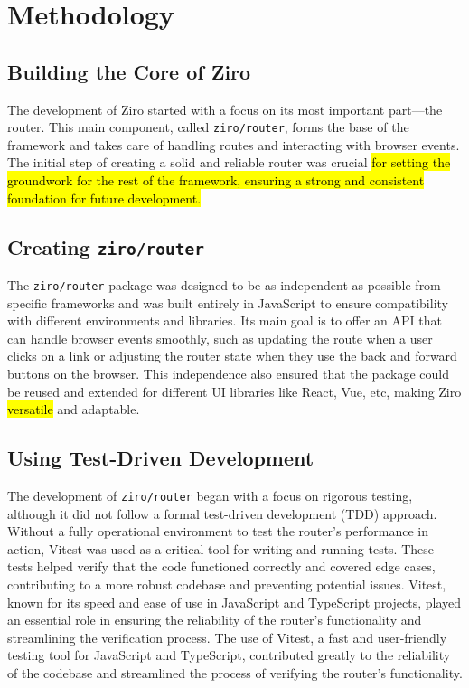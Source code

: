 \section{Methodology} %

\subsection{Building the Core of Ziro}
The development of Ziro started with a focus on its most important part—the router. This main component, called \texttt{ziro/router}, forms the base of the framework and takes care of handling routes and interacting with browser events. The initial step of creating a solid and reliable router was crucial \hl{for setting the groundwork for the rest of the framework, ensuring a strong and consistent foundation for future development.}

\subsection{Creating \texttt{ziro/router}}
The \texttt{ziro/router} package was designed to be as independent as possible from specific frameworks and was built entirely in JavaScript to ensure compatibility with different environments and libraries. Its main goal is to offer an API that can handle browser events smoothly, such as updating the route when a user clicks on a link or adjusting the router state when they use the back and forward buttons on the browser. This independence also ensured that the package could be reused and extended for different UI libraries like React, Vue, etc, making Ziro \hl{versatile} and adaptable.

\subsection{Using Test-Driven Development}
The development of \texttt{ziro/router} began with a focus on rigorous testing, although it did not follow a formal test-driven development (TDD) approach. Without a fully operational environment to test the router's performance in action, Vitest was used as a critical tool for writing and running tests. These tests helped verify that the code functioned correctly and covered edge cases, contributing to a more robust codebase and preventing potential issues. Vitest, known for its speed and ease of use in JavaScript and TypeScript projects, played an essential role in ensuring the reliability of the router's functionality and streamlining the verification process. The use of Vitest, a fast and user-friendly testing tool for JavaScript and TypeScript, contributed greatly to the reliability of the codebase and streamlined the process of verifying the router's functionality.

